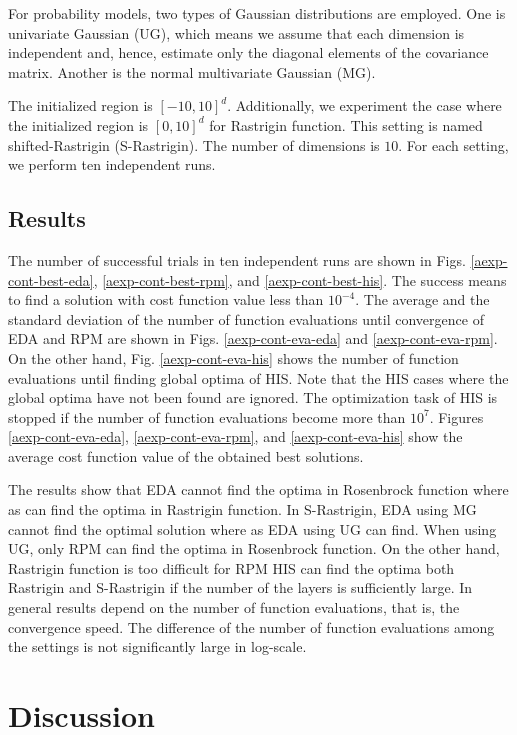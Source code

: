 For probability models, two types of Gaussian distributions are
employed.
One is univariate Gaussian (UG), which means
we assume that each dimension is independent and, hence,
estimate only the diagonal elements of the covariance matrix.
Another is the normal multivariate Gaussian (MG).

The initialized region is $[-10,10]^d$.
Additionally,
we experiment the case where the initialized region is $[0,10]^d$
for Rastrigin function.
This setting is named shifted-Rastrigin (S-Rastrigin).
The number of dimensions is $10$.
For each setting, we perform ten independent runs.


\subsection{Results}
The number of successful trials in ten independent runs
are shown in Figs.  \ref{aexp-cont-best-eda}, \ref{aexp-cont-best-rpm}, 
and \ref{aexp-cont-best-his}.
The success means to find a solution with cost function
value less than $10^{-4}$.
The average and the standard deviation of the number of function evaluations until
convergence of EDA and RPM 
are shown in Figs. \ref{aexp-cont-eva-eda} and  \ref{aexp-cont-eva-rpm}.
On the other hand, Fig. \ref{aexp-cont-eva-his} shows the number of function evaluations
until finding global optima of HIS. Note that the HIS cases where
the global optima have not been found are ignored.
The optimization task of HIS is stopped if the number of function
evaluations become more than $10^7$.
Figures  \ref{aexp-cont-eva-eda}, \ref{aexp-cont-eva-rpm}, 
and \ref{aexp-cont-eva-his} show the average cost function value of the
obtained best solutions.



The results show that
EDA cannot find the optima in Rosenbrock function where as
can find the optima  in Rastrigin function.
In S-Rastrigin, EDA using MG cannot find the optimal solution where as
EDA using UG can find.
When using UG, only RPM can find the optima in Rosenbrock function.
On the other hand, Rastrigin function is too difficult for RPM 
HIS can find the optima both Rastrigin and S-Rastrigin if
the number of the layers is sufficiently large.
In general results depend on the number of function evaluations, that is, 
the convergence speed.
The difference of the number of function evaluations among the settings
is not significantly large in log-scale.

\section{Discussion}

